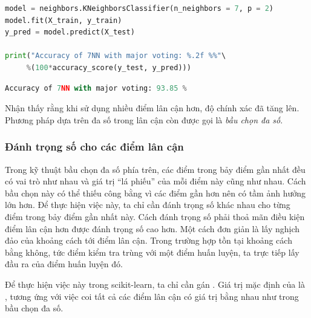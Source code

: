 \begin{lstlisting}[language=Python]
model = neighbors.KNeighborsClassifier(n_neighbors = 7, p = 2)
model.fit(X_train, y_train)
y_pred = model.predict(X_test)

print("Accuracy of 7NN with major voting: %.2f %%"\ 
     %(100*accuracy_score(y_test, y_pred)))

\end{lstlisting}
\kq
\begin{lstlisting}[language=Python]
Accuracy of 7NN with major voting: 93.85 %
\end{lstlisting}

Nhận thấy rằng khi sử dụng nhiều điểm lân cận hơn, độ chính xác đã tăng lên. Phương pháp dựa trên đa số trong lân cận còn được gọi là \textit{bầu chọn đa số}.







\subsubsection{Đánh trọng số cho các điểm lân cận}
Trong kỹ thuật bầu chọn đa số phía trên, các điểm trong bảy điểm gần nhất đều có
vai trò như nhau và giá trị ``lá phiếu'' của mỗi điểm này cũng như nhau. Cách bầu chọn này có thể thiếu công bằng vì các điểm gần hơn nên có tầm ảnh hưởng lớn hơn. Để thực hiện việc này, ta chỉ cần đánh trọng số khác nhau cho từng điểm trong bảy điểm gần nhất này. Cách
đánh trọng số phải thoả mãn điều kiện điểm lân cận hơn được đánh trọng số cao hơn. Một cách đơn giản là lấy nghịch đảo của khoảng
cách tới điểm lân cận. Trong trường hợp tồn tại khoảng cách bằng không, tức điểm kiểm tra trùng với một điểm huấn luyện, ta trực tiếp lấy đầu ra của điểm huấn luyện đó.

Để thực hiện việc này trong scikit-learn, ta chỉ cần gán
. Giá trị mặc định của
 là , tương ứng với việc coi tất
cả các điểm lân cận có giá trị bằng nhau như trong bầu chọn đa số.


